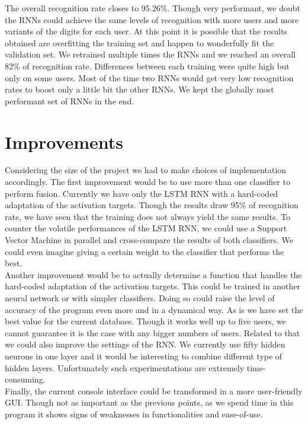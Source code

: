 \documentclass[a4paper]{article}
\begin{document}
{The overall recognition rate closes to 95.26\%. Though very performant, we doubt the RNNs could achieve the same levels of recognition with more users and more variants of the digits for each user. At this point it is possible that the results obtained are overfitting the training set and happen to wonderfully fit the validation set. We retrained multiple times the RNNs and we reached an overall 82\% of recognition rate. Differences between each training were quite high but only on some users. Most of the time two RNNs would get very low recognition rates to boost only a little bit the other RNNs. We kept the globally most performant set of RNNs in the end.

\section{Improvements}

Considering the size of the project we had to make choices of implementation accordingly. The first improvement would be to use more than one classifier to perform fusion. Currently we have only the LSTM RNN with a hard-coded adaptation of the activation targets. Though the results draw 95\% of recognition rate, we have seen that the training does not always yield the same results. To counter the volatile performances of the LSTM RNN, we could use a Support Vector Machine in parallel and cross-compare the results of both classifiers. We could even imagine giving a certain weight to the classifier that performs the best.\\

Another improvement would be to actually determine a function that handles the hard-coded adaptation of the activation targets. This could be trained in another neural network or with simpler classifiers. Doing so could raise the level of accuracy of the program even more and in a dynamical way. As is we have set the best value for the current database. Though it works well up to five users, we cannot guarantee it is the case with any bigger numbers of users. Related to that we could also improve the settings of the RNN. We currently use fifty hidden neurons in one layer and it would be interesting to combine different type of hidden layers. Unfortunately such experimentations are extremely time-consuming.\\

Finally, the current console interface could be transformed in a more user-friendly GUI. Though not as important as the previous points, as we spend time in this program it shows signs of weaknesses in functionalities and ease-of-use.

}
\end{document}
